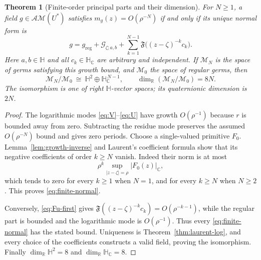 \documentclass[11pt,a4paper]{article}
\numberwithin{equation}{section}
\newtheorem{theorem}{Theorem}[section]
\theoremstyle{definition}
\theoremstyle{remark}
\newcommand{\R}{\mathbb R}
\newcommand{\C}{\mathbb C}
\newcommand{\HH}{\mathbb H}
\newcommand{\HC}{\mathbb H_{\C}}
\newcommand{\Fu}{\mathfrak F}
\newcommand{\AM}{\mathcal{AM}}
\newcommand{\G}{\mathcal G}
\newcommand{\cnorm}[1]{\lvert #1\rvert_{\C}}
\begin{document}
\begin{theorem}[Finite-order principal parts and their dimension]
\label{thm:finite}
For $N\ge1$, a field $g\in\AM(U^*)$ satisfies
$m_g(z)=O(\rho^{-N})$ if and only if its unique normal form is
\begin{equation}\label{eq:finite-normal}
 g=g_{\mathrm{reg}}+\G_{\zeta;a,b}
       +\sum_{k=1}^{N-1}\Fu\bigl((z-\zeta)^{-k}c_k\bigr).
\end{equation}
Here $a,b\in\HH$ and all $c_k\in\HC$ are arbitrary and independent.
If $\mathscr M_N$ is the space of germs satisfying this growth bound,
and $\mathscr M_0$ the space of regular germs, then
\begin{equation}\label{eq:local-dim}
 \mathscr M_N/\mathscr M_0\ \cong\
 \HH^2\oplus\HC^{\,N-1},\qquad
 \dim_\R(\mathscr M_N/\mathscr M_0)=8N.
\end{equation}
The isomorphism is one of right $\HH$-vector spaces; its quaternionic
dimension is $2N$.
\end{theorem}
\begin{proof}
The logarithmic modes \eqref{eq:V}--\eqref{eq:U} have growth
$O(\rho^{-1})$ because $r$ is bounded away from zero. Subtracting the
residue mode preserves the assumed $O(\rho^{-N})$ bound and gives
zero periods. Choose a single-valued primitive $F_0$.
Lemma~\ref{lem:growth-inverse} and Laurent's coefficient formula show
that its negative coefficients of order $k\ge N$ vanish. Indeed their
norm is at most
\[
 \rho^k\sup_{|z-\zeta|=\rho}\cnorm{F_0(z)},
\]
which tends to zero for every $k\ge1$ when $N=1$, and for every
$k\ge N$ when $N\ge2$. This proves \eqref{eq:finite-normal}.

Conversely, \eqref{eq:Fu-first} gives
$\Fu((z-\zeta)^{-k}c_k)=O(\rho^{-k-1})$, while the regular part is
bounded and the logarithmic mode is $O(\rho^{-1})$. Thus every
\eqref{eq:finite-normal} has the stated bound.
Uniqueness is Theorem~\ref{thm:laurent-log}, and every choice of the
coefficients constructs a valid field, proving the isomorphism.
Finally $\dim_\R\HH^2=8$ and $\dim_\R\HC=8$.
\end{proof}
\end{document}
